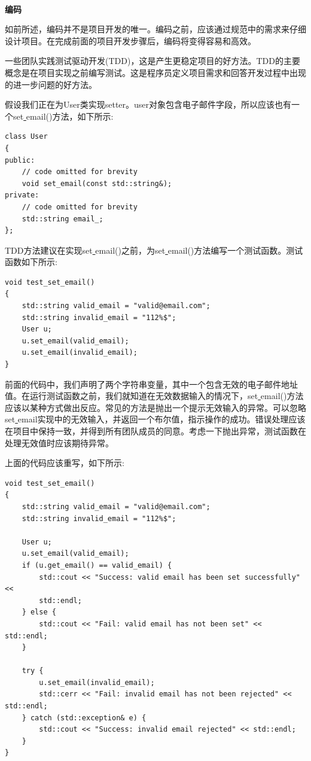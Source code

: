 \noindent\textbf{}\ \par
\textbf{编码} \ \par
如前所述，编码并不是项目开发的唯一。编码之前，应该通过规范中的需求来仔细设计项目。在完成前面的项目开发步骤后，编码将变得容易和高效。 \par
一些团队实践测试驱动开发(TDD)，这是产生更稳定项目的好方法。TDD的主要概念是在项目实现之前编写测试。这是程序员定义项目需求和回答开发过程中出现的进一步问题的好方法。 \par
假设我们正在为User类实现setter。user对象包含电子邮件字段，所以应该也有一个set\underline{ }email()方法，如下所示: \par

\begin{lstlisting}[caption={}]
class User
{
public:
	// code omitted for brevity
	void set_email(const std::string&);
private:
	// code omitted for brevity
	std::string email_;
};
\end{lstlisting}

TDD方法建议在实现set\underline{ }email()之前，为set\underline{ }email()方法编写一个测试函数。测试函数如下所示: \par

\begin{lstlisting}[caption={}]
void test_set_email()
{
	std::string valid_email = "valid@email.com";
	std::string invalid_email = "112%$";
	User u;
	u.set_email(valid_email);
	u.set_email(invalid_email);
}
\end{lstlisting}

前面的代码中，我们声明了两个字符串变量，其中一个包含无效的电子邮件地址值。在运行测试函数之前，我们就知道在无效数据输入的情况下，set\underline{ }email()方法应该以某种方式做出反应。常见的方法是抛出一个提示无效输入的异常。可以忽略set\underline{ }email实现中的无效输入，并返回一个布尔值，指示操作的成功。错误处理应该在项目中保持一致，并得到所有团队成员的同意。考虑一下抛出异常，测试函数在处理无效值时应该期待异常。 \par
上面的代码应该重写，如下所示: \par

\begin{lstlisting}[caption={}]
void test_set_email()
{
	std::string valid_email = "valid@email.com";
	std::string invalid_email = "112%$";
	
	User u;
	u.set_email(valid_email);
	if (u.get_email() == valid_email) {
		std::cout << "Success: valid email has been set successfully" <<
		std::endl;
	} else {
		std::cout << "Fail: valid email has not been set" << std::endl;
	}

	try {
		u.set_email(invalid_email);
		std::cerr << "Fail: invalid email has not been rejected" << std::endl;
	} catch (std::exception& e) {
		std::cout << "Success: invalid email rejected" << std::endl;
	}
}
\end{lstlisting}


